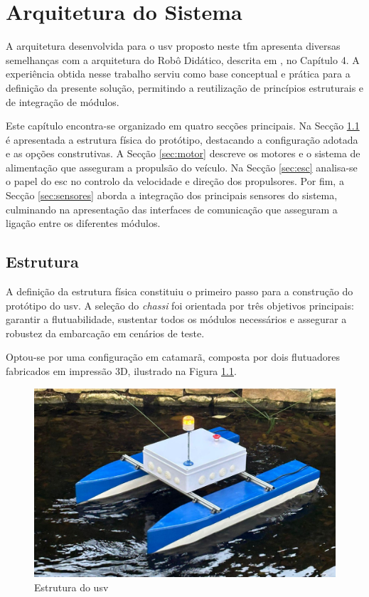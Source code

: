 
\chapter{Arquitetura do Sistema}
\label{ch:arquitetura}

A arquitetura desenvolvida para o \gls{usv} proposto neste \gls{tfm} apresenta diversas semelhanças com a arquitetura do Robô Didático, descrita em \cite{didactic-robot-thesis}, no Capítulo 4. A experiência obtida nesse trabalho serviu como base conceptual e prática para a definição da presente solução, permitindo a reutilização de princípios estruturais e de integração de módulos.  

Este capítulo encontra-se organizado em quatro secções principais. Na Secção \ref{sec:estrutura} é apresentada a estrutura física do protótipo, destacando a configuração adotada e as opções construtivas. A Secção \ref{sec:motor} descreve os motores e o sistema de alimentação que asseguram a propulsão do veículo. Na Secção \ref{sec:esc} analisa-se o papel do \gls{esc} no controlo da velocidade e direção dos propulsores. Por fim, a Secção \ref{sec:sensores} aborda a integração dos principais sensores do sistema, culminando na apresentação das interfaces de comunicação que asseguram a ligação entre os diferentes módulos.

\section{Estrutura}
\label{sec:estrutura}

A definição da estrutura física constituiu o primeiro passo para a construção do protótipo do \gls{usv}. A seleção do \emph{chassi} foi orientada por três objetivos principais: garantir a flutuabilidade, sustentar todos os módulos necessários e assegurar a robustez da embarcação em cenários de teste. 

Optou-se por uma configuração em catamarã, composta por dois flutuadores fabricados em impressão 3D, ilustrado na Figura \ref{fig:usv-francisco}. 

\begin{figure}[h]
    \centering
    \includegraphics[width=0.5\linewidth]{figuras/usv-francisco.png}
    \caption[Estrutura do \gls{usv}]{Estrutura do \gls{usv} \cite{catamara-telecomandado}}
    \label{fig:usv-francisco}
\end{figure}

